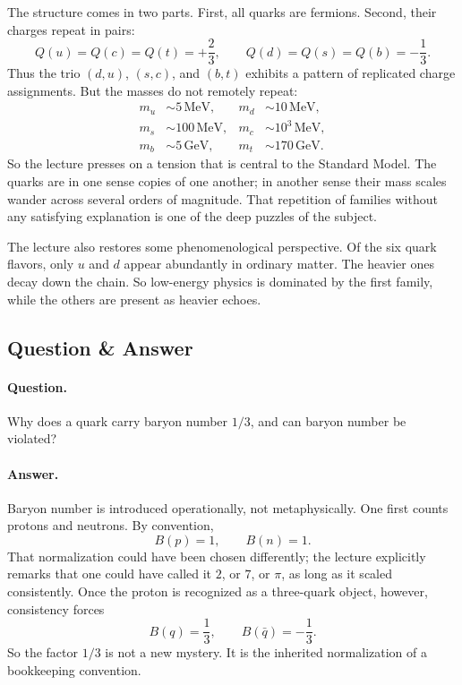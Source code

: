 The structure comes in two parts. First, all quarks are fermions. Second, their charges repeat in pairs:
\begin{equation}
Q(u)=Q(c)=Q(t)=+\frac23,
\qquad
Q(d)=Q(s)=Q(b)=-\frac13.
\end{equation}
Thus the trio \((d,u)\), \((s,c)\), and \((b,t)\) exhibits a pattern of replicated charge assignments. But the masses do not remotely repeat:
\begin{align}
m_u &\sim 5\,\mathrm{MeV},
&
m_d &\sim 10\,\mathrm{MeV},
\\
m_s &\sim 100\,\mathrm{MeV},
&
m_c &\sim 10^3\,\mathrm{MeV},
\\
m_b &\sim 5\,\mathrm{GeV},
&
m_t &\sim 170\,\mathrm{GeV}.
\end{align}
So the lecture presses on a tension that is central to the Standard Model. The quarks are in one sense copies of one another; in another sense their mass scales wander across several orders of magnitude. That repetition of families without any satisfying explanation is one of the deep puzzles of the subject.

The lecture also restores some phenomenological perspective. Of the six quark flavors, only \(u\) and \(d\) appear abundantly in ordinary matter. The heavier ones decay down the chain. So low-energy physics is dominated by the first family, while the others are present as heavier echoes.

\subsection{Question \& Answer}

\paragraph{Question.} Why does a quark carry baryon number \(1/3\), and can baryon number be violated?

\paragraph{Answer.} Baryon number is introduced operationally, not metaphysically. One first counts protons and neutrons. By convention,
\begin{equation}
B(p)=1,\qquad B(n)=1.
\end{equation}
That normalization could have been chosen differently; the lecture explicitly remarks that one could have called it \(2\), or \(7\), or \(\pi\), as long as it scaled consistently. Once the proton is recognized as a three-quark object, however, consistency forces
\begin{equation}
B(q)=\frac13,
\qquad
B(\bar q)=-\frac13.
\end{equation}
So the factor \(1/3\) is not a new mystery. It is the inherited normalization of a bookkeeping convention.

